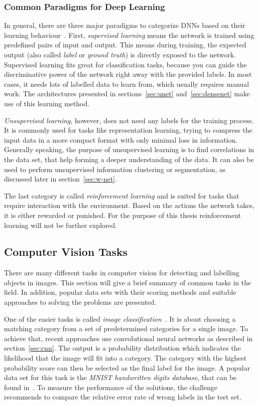 \subsubsection{Common Paradigms for Deep Learning}
\label{sec:dl_paradigms}
In general, there are three major paradigms to categorize DNNs based on their learning behaviour~\cite[p.~214f]{dlma14}. First, \emph{supervised learning} means the network is trained using predefined pairs of input and output. This means during training, the expected output (also called \emph{label} or \emph{ground truth}) is directly exposed to the network. Supervised learning fits great for classification tasks, because you can guide the discriminative power of the network right away with the provided labels. In most cases, it needs lots of labelled data to learn from, which usually requires manual work. The architectures presented in sections~\ref{sec:unet} and~\ref{sec:densenet} make use of this learning method.

\emph{Unsupervised learning}, however, does not need any labels for the training process. It is commonly used for tasks like representation learning, trying to compress the input data in a more compact format with only minimal loss in information. Generally speaking, the purpose of unsupervised learning is to find correlations in the data set, that help forming a deeper understanding of the data. It can also be used to perform unsupervised information clustering or segmentation, as discussed later in section~\ref{sec:w-net}.

The last category is called \emph{reinforcement learning} and is suited for tasks that require interaction with the environment. Based on the actions the network takes, it is either rewarded or punished. For the purpose of this thesis reinforcement learning will not be further explored.

\subsection{Computer Vision Tasks}
There are many different tasks in computer vision for detecting and labelling objects in images. This section will give a brief summary of common tasks in the field. In addition, popular data sets with their scoring methods and suitable approaches to solving the problems are presented.

One of the easier tasks is called \emph{image classification}~\cite[p.~98]{DLbook16}. It is about choosing a matching category from a set of predetermined categories for a single image. To achieve that, recent approaches use convolutional neural networks as described in section~\ref{sec:cnn}. The output is a probability distribution which indicates the likelihood that the image will fit into a category. The category with the highest probability score can then be selected as the final label for the image. A popular data set for this task is the \emph{MNIST handwritten digits database}, that can be found in~\cite{mnist10}. To measure the performance of the solutions, the challenge recommends to compare the relative error rate of wrong labels in the test set.

